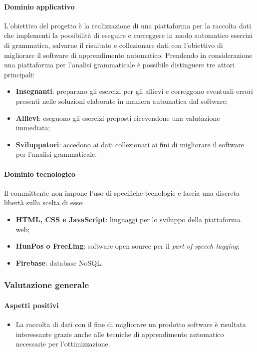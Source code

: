 {	\paragraph{Dominio applicativo} \Spazio
	L'obiettivo del progetto è la realizzazione di una piattaforma per la raccolta dati che implementi la possibilità di eseguire e correggere in modo automatico esercizi di grammatica, salvarne il risultato e collezionare dati con l'obiettivo di migliorare il software di apprendimento automatico.
	Prendendo in considerazione una piattaforma per l'analisi grammaticale è possibile distinguere tre attori principali:
	\begin{itemize} 
	\item \textbf{Insegnanti}: preparano gli esercizi per gli allievi e correggono eventuali errori presenti nelle soluzioni elaborate in maniera automatica dal software;
	\item \textbf{Allievi}: eseguono gli esercizi proposti ricevendone una valutazione immediata;
	\item \textbf{Sviluppatori}: accedono ai dati collezionati ai fini di migliorare il software per l'analisi grammaticale.
	\end{itemize}
	\paragraph{Dominio tecnologico} \Spazio
	Il committente non impone l'uso di specifiche tecnologie e lascia una discreta libertà sulla scelta di esse:
	\begin{itemize}
		\item \textbf{HTML, CSS e JavaScript}: linguaggi per lo sviluppo della piattaforma web;
		\item \textbf{HunPos o FreeLing}: software open source per il \emph{part-of-speech tagging};
		\item  \textbf{Firebase}: database NoSQL.
	\end{itemize}
	\subsubsection{Valutazione generale}
	\paragraph{Aspetti positivi}
	\begin{itemize}
		\item {La raccolta di dati con il fine di migliorare un prodotto software è risultata interessante grazie anche alle tecniche di apprendimento automatico necessarie per l'ottimizzazione.}
	\end{itemize} 
}
